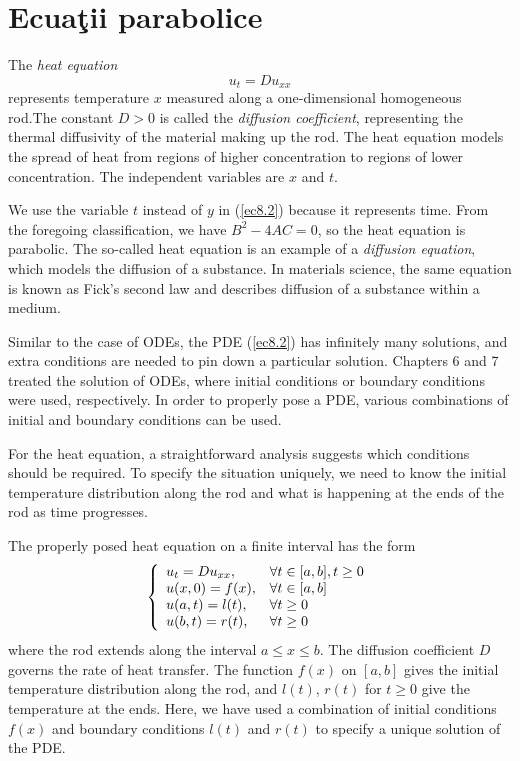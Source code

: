 \documentclass{book}%
\begin{document}
\chapter{Ecua\c{t}ii parabolice}

The \emph{heat equation}%
\begin{equation}
u_{t}=Du_{xx} \label{ec8.2}%
\end{equation}
represents temperature $x$ measured along a one-dimensional homogeneous
rod.The constant $D>0$ is called the \emph{diffusion coefficient},
representing the thermal diffusivity of the material making up the rod. The
heat equation models the spread of heat from regions of higher concentration
to regions of lower concentration. The independent variables are $x$ and $t$.

We use the variable $t$ instead of $y$ in (\ref{ec8.2}) because it represents
time. From the foregoing classification, we have $B^{2}-4AC=0$, so the heat
equation is parabolic. The so-called heat equation is an example of a
\emph{diffusion equation}, which models the diffusion of a substance. In
materials science, the same equation is known as Fick's second law and
describes diffusion of a substance within a medium.

Similar to the case of ODEs, the PDE (\ref{ec8.2}) has infinitely many
solutions, and extra conditions are needed to pin down a particular solution.
Chapters 6 and 7 treated the solution of ODEs, where initial conditions or
boundary conditions were used, respectively. In order to properly pose a PDE,
various combinations of initial and boundary conditions can be used.

For the heat equation, a straightforward analysis suggests which conditions
should be required. To specify the situation uniquely, we need to know the
initial temperature distribution along the rod and what is happening at the
ends of the rod as time progresses.

The properly posed heat equation on a finite interval has the form%
\begin{equation}
\left\{
\begin{array}
[c]{ll}%
u_{t}=Du_{xx}, & \forall t\in\lbrack a,b],t\geq0\\
u(x,0)=f(x), & \forall t\in\lbrack a,b]\\
u(a,t)=l(t), & \forall t\geq0\\
u(b,t)=r(t), & \forall t\geq0
\end{array}
\right.  \label{ec8.3}%
\end{equation}
where the rod extends along the interval $a\leq x\leq b$. The diffusion
coefficient $D$ governs the rate of heat transfer. The function $f(x)$ on
$[a,b]$ gives the initial temperature distribution along the rod, and $l(t)$,
$r(t)$ for $t\geq0$ give the temperature at the ends. Here, we have used a
combination of initial conditions $f(x)$ and boundary conditions $l(t)$ and
$r(t)$ to specify a unique solution of the PDE.
\end{document}
